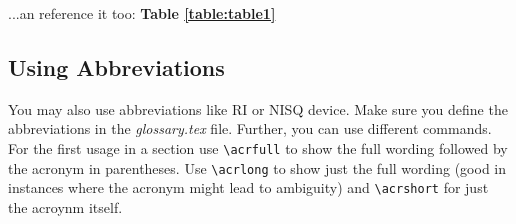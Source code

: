 ...an reference it too: \textbf{Table \ref{table:table1}}


\subsection{Using Abbreviations}
You may also use abbreviations like \acrfull{RI} or \acrfull{NISQ} device. Make sure you define the abbreviations in the \textit{glossary.tex} file. Further, you can use different commands. For the first usage in a section use \verb|\acrfull| to show the full wording followed by the acronym in parentheses. Use \verb|\acrlong| to show just the full wording (good in instances where the acronym might lead to ambiguity) and \verb|\acrshort| for just the acroynm itself. 